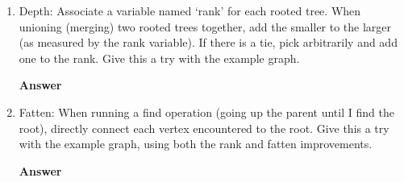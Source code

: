 \documentclass{article}
\begin{document}
\begin{enumerate}

    \item Depth: Associate a variable named `rank' for each rooted tree. When unioning
        (merging) two rooted trees together, add the smaller to the larger (as
        measured by the rank variable).  If
        there is a tie, pick arbitrarily and add one to the rank.
        Give this a try with the example graph.

        \textbf{Answer}
        \vspace{3in}

    \item Fatten: When running a find operation (going up the parent until I
        find the root), directly connect each vertex encountered to the root.
        Give this a try with the example graph, using both the rank and fatten
        improvements.

        \textbf{Answer}
        \vspace{3in}
\end{enumerate}
\end{document}
